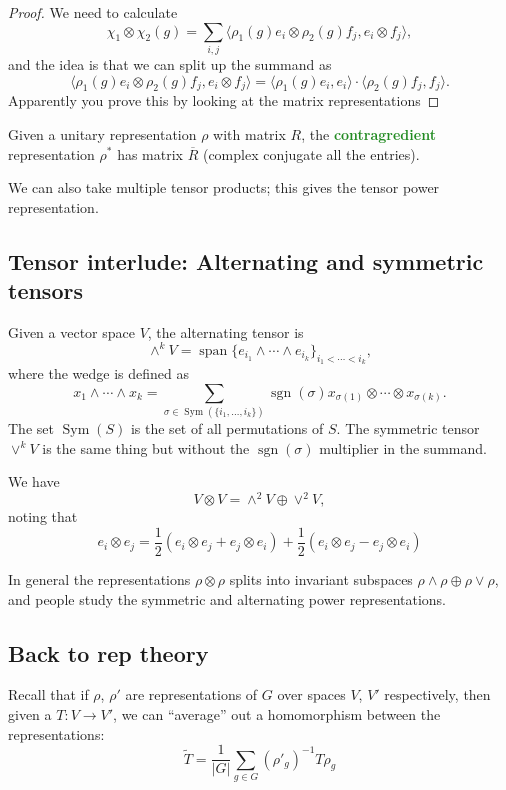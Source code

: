 \documentclass[10pt]{scrartcl}
\providecommand{\ol}{\overline}
\providecommand{\half}{\frac{1}{2}}
\providecommand{\opname}{\operatorname}
\providecommand{\inv}{^{-1}}
\providecommand{\vocab}[1]{{\textbf{\textcolor{ForestGreen}{#1}}}}
\providecommand{\tensor}{\otimes}
\begin{document}
\begin{proof}
	We need to calculate
	\[\chi_1\otimes\chi_2(g) =\sum_{i,j}
	\langle \rho_1(g)e_i\otimes\rho_2(g)f_j, e_i\otimes f_j\rangle,\]
	and the idea is that we can split up the summand as
	\[\langle \rho_1(g)e_i\otimes\rho_2(g)f_j, e_i\otimes f_j\rangle
	= \langle \rho_1(g)e_i, e_i\rangle\cdot\langle\rho_2(g)f_j,f_j\rangle.\]
	Apparently you prove this by looking at the matrix representations
\end{proof}

\begin{definition}
	Given a unitary representation $\rho$ with matrix $R$,
	the \vocab{contragredient} representation $\rho^\ast$ has matrix
	$\ol R$ (complex conjugate all the entries).
\end{definition}

We can also take multiple tensor products; this gives the tensor power
representation.

\subsection{Tensor interlude: Alternating and symmetric tensors}
Given a vector space $V$, the alternating tensor is
\[\wedge^k V = \opname{span}\{e_{i_1}\wedge\cdots\wedge e_{i_k}\}_{i_1<\cdots<i_k},\]
where the wedge is defined as
\[x_1\wedge\cdots\wedge x_k = \sum_{\sigma\in \opname{Sym}(\{i_1,\dots,i_k\})}
\opname{sgn}(\sigma) x_{\sigma(1)}\otimes\cdots\otimes x_{\sigma(k)}.\]
The set $\opname{Sym}(S)$ is the set of all permutations of $S$.
The symmetric tensor $\vee^k V$ is the same thing but without
the $\opname{sgn}(\sigma)$ multiplier in the summand.

We have
\[V\tensor V = \wedge^2 V\oplus \vee^2 V,\]
noting that
\[e_i\tensor e_j = \half(e_i\tensor e_j + e_j\tensor e_i) +
\half(e_i\tensor e_j - e_j\tensor e_i)\]

In general the representations $\rho\tensor \rho$ splits
into invariant subspaces $\rho\wedge\rho\oplus\rho\vee\rho$,
and people study the symmetric and alternating power representations.

\subsection{Back to rep theory}
Recall that if $\rho$, $\rho'$ are representations of $G$ over spaces
$V$, $V'$ respectively, then given a $T\colon V\to V'$,
we can ``average'' out a homomorphism between the representations:
\[\widetilde T = \frac 1{|G|} \sum_{g\in G} (\rho'_g)\inv T\rho_g\]
\end{document}
